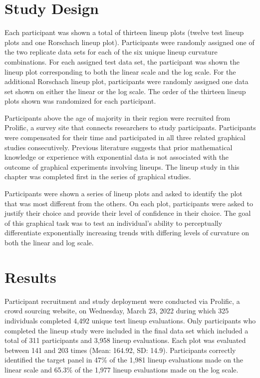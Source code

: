 \documentclass[12pt]{article}
\begin{document}
\hypertarget{study-design}{%
\section{Study Design}\label{study-design}}

Each participant was shown a total of thirteen lineup plots (twelve test
lineup plots and one Rorschach lineup plot). Participants were randomly
assigned one of the two replicate data sets for each of the six unique
lineup curvature combinations. For each assigned test data set, the
participant was shown the lineup plot corresponding to both the linear
scale and the log scale. For the additional Rorschach lineup plot,
participants were randomly assigned one data set shown on either the
linear or the log scale. The order of the thirteen lineup plots shown
was randomized for each participant.

Participants above the age of majority in their region were recruited
from Prolific, a survey site that connects researchers to study
participants. Participants were compensated for their time and
participated in all three related graphical studies consecutively.
Previous literature suggests that prior mathematical knowledge or
experience with exponential data is not associated with the outcome of
graphical experiments involving lineups\citep{vanderplas2015spatial}.
The lineup study in this chapter was completed first in the series of
graphical studies.

Participants were shown a series of lineup plots and asked to identify
the plot that was most different from the others. On each plot,
participants were asked to justify their choice and provide their level
of confidence in their choice. The goal of this graphical task was to
test an individual's ability to perceptually differentiate exponentially
increasing trends with differing levels of curvature on both the linear
and log scale.

\hypertarget{results}{%
\section{Results}\label{results}}

Participant recruitment and study deployment were conducted via
Prolific, a crowd sourcing website, on Wednesday, March 23, 2022 during
which 325 individuals completed 4,492 unique test lineup evaluations.
Only participants who completed the lineup study were included in the
final data set which included a total of 311 participants and 3,958
lineup evaluations. Each plot was evaluated between 141 and 203 times
(Mean: 164.92, SD: 14.9). Participants correctly identified the target
panel in 47\% of the 1,981 lineup evaluations made on the linear scale
and 65.3\% of the 1,977 lineup evaluations made on the log scale.
\end{document}
